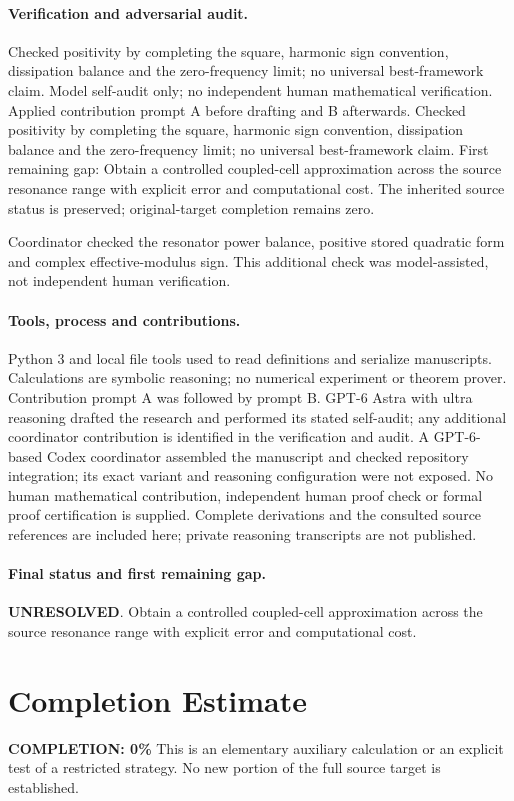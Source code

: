 \documentclass[11pt]{article}
\begin{document}
\paragraph{Verification and adversarial audit.}
Checked positivity by completing the square, harmonic sign convention, dissipation balance and the zero-frequency limit; no universal best-framework claim. Model self-audit only; no independent human mathematical verification. Applied contribution prompt A before drafting and B afterwards. Checked positivity by completing the square, harmonic sign convention, dissipation balance and the zero-frequency limit; no universal best-framework claim. First remaining gap: Obtain a controlled coupled-cell approximation across the source resonance range with explicit error and computational cost. The inherited source status is preserved; original-target completion remains zero.

Coordinator checked the resonator power balance, positive stored quadratic form and complex effective-modulus sign. This additional check was model-assisted, not independent human verification.

\paragraph{Tools, process and contributions.}
Python 3 and local file tools used to read definitions and serialize manuscripts. Calculations are symbolic reasoning; no numerical experiment or theorem prover. Contribution prompt A was followed by prompt B. GPT-6 Astra with ultra reasoning drafted the research and performed its stated self-audit; any additional coordinator contribution is identified in the verification and audit. A GPT-6-based Codex coordinator assembled the manuscript and checked repository integration; its exact variant and reasoning configuration were not exposed. No human mathematical contribution, independent human proof check or formal proof certification is supplied. Complete derivations and the consulted source references are included here; private reasoning transcripts are not published.

\paragraph{Final status and first remaining gap.}
\textbf{UNRESOLVED}. Obtain a controlled coupled-cell approximation across the source resonance range with explicit error and computational cost.

\section{Completion Estimate}
\noindent\textbf{COMPLETION: 0\%}
This is an elementary auxiliary calculation or an explicit test of a restricted strategy. No new portion of the full source target is established.
\end{document}
